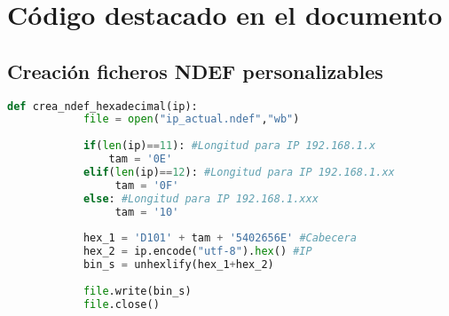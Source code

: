 \chapter{Código destacado en el documento}

	\section{Creación ficheros NDEF personalizables} \label{codigo_ndef}
    \begin{lstlisting}[style=codigo,label={lst:listing-python},language=Python]
        def crea_ndef_hexadecimal(ip):
            file = open("ip_actual.ndef","wb")
        
            if(len(ip)==11): #Longitud para IP 192.168.1.x
                tam = '0E'
            elif(len(ip)==12): #Longitud para IP 192.168.1.xx
                 tam = '0F'
            else: #Longitud para IP 192.168.1.xxx
                 tam = '10'
            
            hex_1 = 'D101' + tam + '5402656E' #Cabecera
            hex_2 = ip.encode("utf-8").hex() #IP
            bin_s = unhexlify(hex_1+hex_2)
        
            file.write(bin_s)
            file.close()
        \end{lstlisting}
